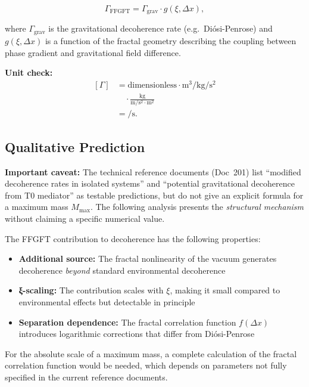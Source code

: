 	\begin{equation}
		\Gamma_{\text{FFGFT}} = \Gamma_{\text{grav}} \cdot g(\xi, \Delta x),
	\end{equation}
	
	where \(\Gamma_{\text{grav}}\) is the gravitational decoherence rate (e.g.\ Diósi-Penrose) and \(g(\xi, \Delta x)\) is a function of the fractal geometry describing the coupling between phase gradient and gravitational field difference.
	
	\textbf{Unit check:}
     \[
\begin{aligned}
	[\Gamma]
	&= \text{dimensionless}
	\cdot \si{\meter\cubed\per\kilo\gram\per\second\squared} \\
	&\quad \cdot
	\frac{\si{\kilo\gram}}{
		\si{\meter\per\second\squared} \cdot \si{\meter^2}
	} \\
	&= \si{\per\second}.
\end{aligned}
\]
	
	\subsection*{Qualitative Prediction}
	
	\textbf{Important caveat:} The technical reference documents (Doc~201) list ``modified decoherence rates in isolated systems'' and ``potential gravitational decoherence from T0 mediator'' as testable predictions, but do not give an explicit formula for a maximum mass \(M_{\max}\). The following analysis presents the \emph{structural mechanism} without claiming a specific numerical value.
	
	The FFGFT contribution to decoherence has the following properties:
	
	\begin{itemize}
		\item \textbf{Additional source:} The fractal nonlinearity of the vacuum generates decoherence \emph{beyond} standard environmental decoherence
		\item \textbf{ξ-scaling:} The contribution scales with \(\xi\), making it small compared to environmental effects but detectable in principle
		\item \textbf{Separation dependence:} The fractal correlation function \(f(\Delta x)\) introduces logarithmic corrections that differ from Diósi-Penrose
	\end{itemize}
	
	For the absolute scale of a maximum mass, a complete calculation of the fractal correlation function would be needed, which depends on parameters not fully specified in the current reference documents.
	
